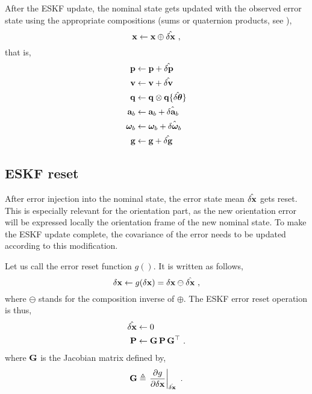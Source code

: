 {After the ESKF update, the nominal state gets updated with the observed error state using the appropriate compositions (sums or quaternion products, see ),
%
\begin{equation}
{\bf x} \gets {\bf x} \oplus \hat{\delta{\bf x}}~, \label{equ:errorInjection}
\end{equation}
%
that is,
%
\begin{subequations}
%
\begin{align}
{\bf p} &\gets {\bf p} + \hat{\delta{\bf p}} \\
{\bf v} &\gets {\bf v} + \hat{\delta{\bf v}} \\
{\bf q} &\gets {\bf q} \otimes {\bf q}\{\hat{\delta{\bm \theta}}\} \label{equ:quatErrorInjection}\\
{\bf a}_b &\gets {\bf a}_b + \hat{\delta{\bf a}_b} \\
{\bm \omega}_b &\gets {\bm \omega}_b + \hat{\delta{\bm \omega}_b} \\
{\bf g} &\gets {\bf g} + \hat{\delta{\bf g}} 
\end{align}%
\end{subequations}%

\subsection{ESKF reset}

After error injection into the nominal state, the error state mean $\hat{\delta{\bf x}}$ gets reset. 
This is especially relevant for the orientation part, as the new orientation error will be expressed locally \wrt the orientation frame of the new nominal state. 
To make the ESKF update complete, the covariance of the error needs to be updated according to this modification.

\bigskip

Let us call the error reset function $g()$. 
It is written as follows,
%
\begin{equation}
\delta{\bf x} \gets g(\delta{\bf x}) = \delta{\bf x} \ominus \hat{\delta{\bf x}}~, \label{equ:resetFcn}
\end{equation}
%
where $\ominus$ stands for the composition inverse of $\oplus$. 
The ESKF error reset operation is thus,
%
\begin{align}
\hat{\delta{\bf x}} &\gets 0 \\
{\bf P} &\gets {\bf G}\,{\bf P}\,{\bf G}^{\top}~.
\end{align}
%
where ${\bf G}$ is the Jacobian matrix defined by,
%
\begin{equation}
{\bf G} \triangleq \left.\frac{\partial g}{\partial\delta{\bf x}}\right|_{\hat{\delta{\bf x}}}~.
\end{equation}

}
